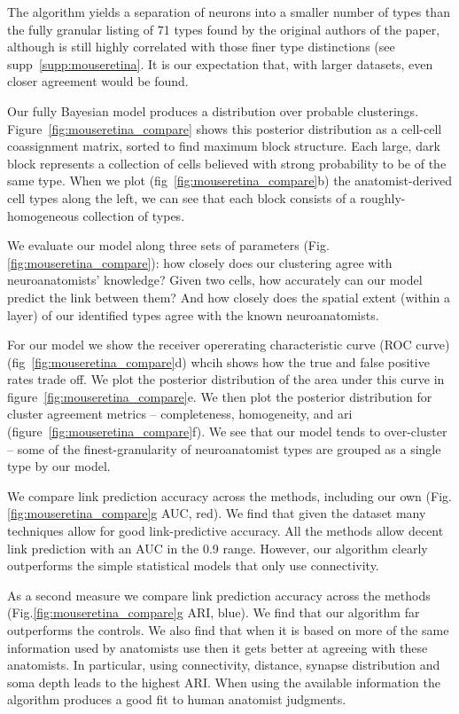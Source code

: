 \documentclass{article}
\begin{document}
The algorithm yields a separation of neurons into a smaller number of
types than the fully granular listing of 71 types found by the
original authors of the paper, although is still highly correlated
with those finer type distinctions (see
supp~\ref{supp:mouseretina}. It is our expectation that, with larger
datasets, even closer agreement would be found.

Our fully Bayesian model produces a distribution over probable
clusterings.  Figure~\ref{fig:mouseretina_compare} shows this
posterior distribution as a cell-cell coassignment matrix, sorted to
find maximum block structure. Each large, dark block represents a
collection of cells believed with strong probability to be of the same
type. When we plot (fig~\ref{fig:mouseretina_compare}b) the
anatomist-derived cell types along the left, we can see that each
block consists of a roughly-homogeneous collection of types. 

We evaluate our model along three sets of parameters
(Fig.\ref{fig:mouseretina_compare}): how closely does our clustering agree
with neuroanatomists' knowledge?  Given two cells, how accurately can
our model predict the link between them? And how closely does the
spatial extent (within a layer) of our identified types agree with the
known neuroanatomists.

For our model we show the receiver opererating characteristic curve
(ROC curve) (fig~\ref{fig:mouseretina_compare}d) whcih shows how the
true and false positive rates trade off. We plot the posterior
distribution of the area under this curve in
figure~\ref{fig:mouseretina_compare}e. We then plot the 
posterior distribution for cluster agreement metrics -- completeness,
homogeneity, and ari (figure~\ref{fig:mouseretina_compare}f). We see
that our model tends to over-cluster -- some of the finest-granularity of
neuroanatomist types are grouped as a single type by our model. 

We compare link prediction accuracy across the
methods, including our own (Fig.\ref{fig:mouseretina_compare}g AUC, red).  We find that
given the dataset many techniques allow for good link-predictive
accuracy. All the methods allow decent link prediction with an AUC in
the 0.9 range. However, our algorithm clearly outperforms the simple
statistical models that only use connectivity.

As a second measure we compare link prediction accuracy across the
methods (Fig.\ref{fig:mouseretina_compare}g ARI, blue). We find that our
algorithm far outperforms the controls. We also find that when it is
based on more of the same information used by anatomists use then it
gets better at agreeing with these anatomists. In particular, using
connectivity, distance, synapse distribution and soma depth leads to
the highest ARI. When using the available information the algorithm
produces a good fit to human anatomist judgments.
\end{document}
